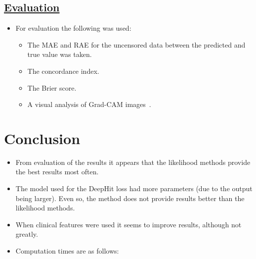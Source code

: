 \documentclass[portrait, color=UCLburgundy, margin=1cm]{uclposter}
\begin{document}
\begin{multicols}{2}
            \subsection*{\underline{\textbf{Evaluation}}}
                \begin{itemize}
                    \item For evaluation the following was used:

                    \begin{itemize}
                        \item The \gls{MAE} and \gls{RAE} for the uncensored data between the predicted and true value was taken.
                        
                        \item The concordance index.
                        
                        \item The Brier score.
                        
                        \item A visual analysis of Grad-CAM images~\cite{Selvaraju2020Grad-CAM:Localization}.
                    \end{itemize}
                \end{itemize}
                
        \section*{Conclusion}
            \begin{highlightbox}[UCLlightgreen]
                \begin{itemize}
                    \item From evaluation of the results it appears that the likelihood methods provide the best results most often.
                    
                    \item The model used for the DeepHit loss had more parameters (due to the output being larger). Even so, the method does not provide results better than the likelihood methods.
                    
                    \item When clinical features were used it seems to improve results, although not greatly.

                    \item Computation times are as follows:


\end{itemize}
\end{highlightbox}
\end{multicols}
\end{document}
